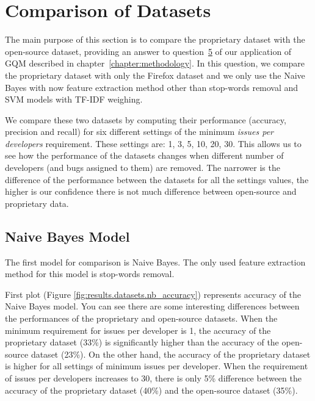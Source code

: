 \section{Comparison of Datasets}
\label{section:comparison-of-datasets}

The main purpose of this section is to compare the proprietary dataset with the open-source dataset, providing an answer to question~\hyperlink{question:5}{5} of our application of GQM described in chapter~\ref{chapter:methodology}. In this question, we compare the proprietary dataset with only the Firefox dataset and we only use the Naive Bayes with now feature extraction method other than stop-words removal and SVM models with TF-IDF weighing.

We compare these two datasets by computing their performance (accuracy, precision and recall) for six different settings of the minimum \textit{issues per developers} requirement. These settings are: 1, 3, 5, 10, 20, 30. This allows us to see how the performance of the datasets changes when different number of developers (and bugs assigned to them) are removed. The narrower is the difference of the performance between the datasets for all the settings values, the higher is our confidence there is not much difference between open-source and proprietary data.

\subsection{Naive Bayes Model}

The first model for comparison is Naive Bayes. The only used feature extraction method for this model is stop-words removal.

First plot (Figure \ref{fig:results.datasets.nb_accuracy}) represents accuracy of the Naive Bayes model. You can see there are some interesting differences between the performances of the proprietary and open-source datasets. When the minimum requirement for issues per developer is 1, the accuracy of the proprietary dataset (33\%) is significantly higher than the accuracy of the open-source dataset (23\%). On the other hand, the accuracy of the proprietary dataset is higher for all settings of minimum issues per developer. When the requirement of issues per developers increases to 30, there is only 5\% difference between the accuracy of the proprietary dataset (40\%) and the open-source dataset (35\%).

